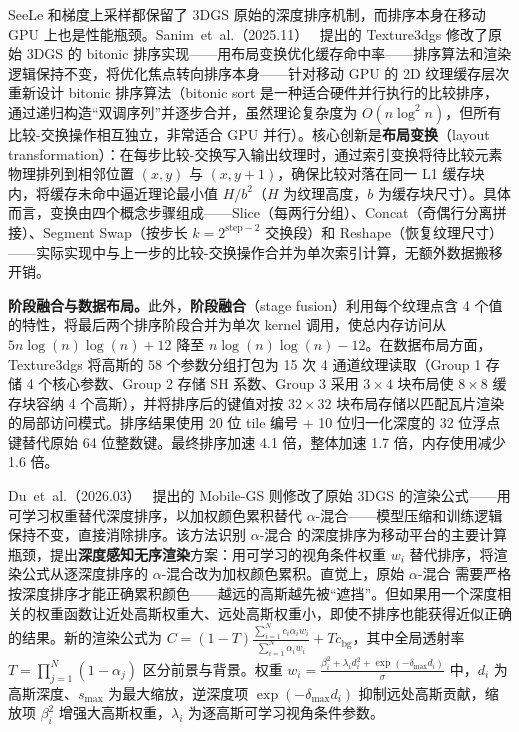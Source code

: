 SeeLe 和梯度上采样都保留了 3DGS 原始的深度排序机制，而排序本身在移动 GPU 上也是性能瓶颈。Sanim~et~al.（2025.11）~\cite{2511_16298} 提出的 Texture3dgs 修改了原始 3DGS 的 bitonic 排序实现——用布局变换优化缓存命中率——排序算法和渲染逻辑保持不变，将优化焦点转向排序本身——针对移动 GPU 的 2D 纹理缓存层次重新设计 bitonic 排序算法（bitonic sort 是一种适合硬件并行执行的比较排序，通过递归构造“双调序列”并逐步合并，虽然理论复杂度为 $O(n\log^2 n)$，但所有比较-交换操作相互独立，非常适合 GPU 并行）。核心创新是\textbf{布局变换}（layout transformation）：在每步比较-交换写入输出纹理时，通过索引变换将待比较元素物理排列到相邻位置 $(x, y)$ 与 $(x, y\!+\!1)$，确保比较对落在同一 L1 缓存块内，将缓存未命中逼近理论最小值 $H/b^2$（$H$ 为纹理高度，$b$ 为缓存块尺寸）。具体而言，变换由四个概念步骤组成——Slice（每两行分组）、Concat（奇偶行分离拼接）、Segment Swap（按步长 $k=2^{\text{step}-2}$ 交换段）和 Reshape（恢复纹理尺寸）——实际实现中与上一步的比较-交换操作合并为单次索引计算，无额外数据搬移开销。

\textbf{阶段融合与数据布局。}此外，\textbf{阶段融合}（stage fusion）利用每个纹理点含 4 个值的特性，将最后两个排序阶段合并为单次 kernel 调用，使总内存访问从 $5n\log(n)\log(n)+12$ 降至 $n\log(n)\log(n)-12$。在数据布局方面，Texture3dgs 将高斯的 58 个参数分组打包为 15 次 4 通道纹理读取（Group 1 存储 4 个核心参数、Group 2 存储 SH 系数、Group 3 采用 $3\!\times\!4$ 块布局使 $8\!\times\!8$ 缓存块容纳 4 个高斯），并将排序后的键值对按 $32\!\times\!32$ 块布局存储以匹配瓦片渲染的局部访问模式。排序结果使用 20 位 tile 编号 + 10 位归一化深度的 32 位浮点键替代原始 64 位整数键。最终排序加速 4.1 倍，整体加速 1.7 倍，内存使用减少 1.6 倍。

Du~et~al.（2026.03）~\cite{2603_11531} 提出的 Mobile-GS 则修改了原始 3DGS 的渲染公式——用可学习权重替代深度排序，以加权颜色累积替代 $\alpha$-混合——模型压缩和训练逻辑保持不变，直接消除排序。该方法识别 $\alpha$-混合 的深度排序为移动平台的主要计算瓶颈，提出\textbf{深度感知无序渲染}方案：用可学习的视角条件权重 $w_i$ 替代排序，将渲染公式从逐深度排序的 $\alpha$-混合改为加权颜色累积。直觉上，原始 $\alpha$-混合 需要严格按深度排序才能正确累积颜色——越远的高斯越先被“遮挡”。但如果用一个深度相关的权重函数让近处高斯权重大、远处高斯权重小，即使不排序也能获得近似正确的结果。新的渲染公式为 $C=(1\!-\!T)\frac{\sum_{i=1}^N c_i\alpha_i w_i}{\sum_{i=1}^N\alpha_i w_i}+Tc_{\text{bg}}$，其中全局透射率 $T=\prod_{j=1}^N(1\!-\!\alpha_j)$ 区分前景与背景。权重 $w_i=\frac{\beta_i^2+\lambda_i d_i^2+\exp(-\delta_{\max}d_i)}{\sigma}$ 中，$d_i$ 为高斯深度、$s_{\max}$ 为最大缩放，逆深度项 $\exp(-\delta_{\max}d_i)$ 抑制远处高斯贡献，缩放项 $\beta_i^2$ 增强大高斯权重，$\lambda_i$ 为逐高斯可学习视角条件参数。

